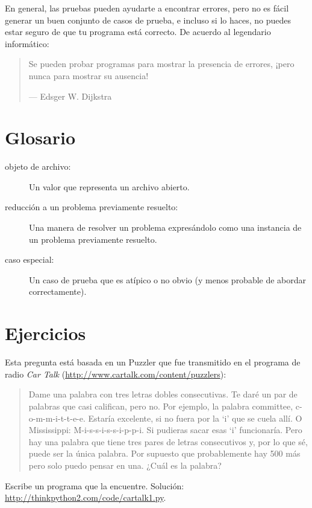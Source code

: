 \documentclass[10pt]{book}
\begin{document}
En general, las pruebas pueden ayudarte a encontrar errores, pero no es fácil
generar un buen conjunto de casos de prueba, e incluso si lo haces, no puedes
estar seguro de que tu programa está correcto.
De acuerdo al legendario informático:

\begin{quote}
Se pueden probar programas para mostrar la presencia de errores, ¡pero nunca para
mostrar su ausencia!

--- Edsger W. Dijkstra
\end{quote}


\section{Glosario}

\begin{description}

\item[objeto de archivo:] Un valor que representa un archivo abierto.

\item[reducción a un problema previamente resuelto:] Una manera de resolver un
  problema expresándolo como una instancia de un problema previamente
  resuelto.  

\item[caso especial:] Un caso de prueba que es atípico o no obvio
(y menos probable de abordar correctamente).

\end{description}


\section{Ejercicios}

\begin{exercise}

Esta pregunta está basada en un Puzzler que fue transmitido en el programa
de radio {\em Car Talk}
(\url{http://www.cartalk.com/content/puzzlers}):

\begin{quote}
Dame una palabra con tres letras dobles consecutivas. Te daré un
par de palabras que casi califican, pero no. Por ejemplo, la palabra
committee, c-o-m-m-i-t-t-e-e. Estaría excelente, si no fuera por la `i' que
se cuela allí. O Mississippi: M-i-s-s-i-s-s-i-p-p-i. Si pudieras
sacar esas `i' funcionaría. Pero hay una palabra que tiene tres
pares de letras consecutivos y, por lo que sé, puede ser
la única palabra. Por supuesto que probablemente hay 500 más pero solo puedo
pensar en una. ¿Cuál es la palabra?
\end{quote}

Escribe un programa que la encuentre.
Solución: \url{http://thinkpython2.com/code/cartalk1.py}.

\end{exercise}
\end{document}
